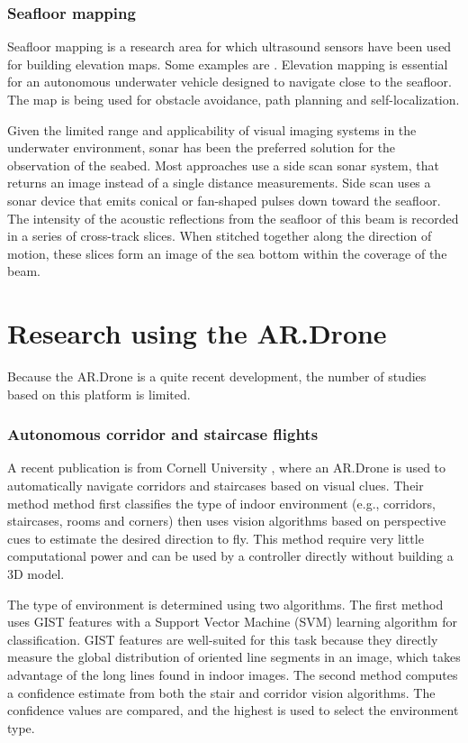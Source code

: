 \subsubsection{Seafloor mapping}
Seafloor mapping is a research area for which ultrasound sensors have been used for building elevation maps. Some examples are \cite{johnson1996seafloor,strauss1999multibeam,zerr1996three,evans2002three}.
Elevation mapping is essential for an autonomous underwater vehicle designed to navigate close to the seafloor.
The map is being used for obstacle avoidance, path planning and self-localization.

Given the limited range and applicability of visual imaging systems in the underwater environment,
sonar has been the preferred solution \cite{blondel1997handbook} for the observation of the seabed.
Most approaches use a side scan sonar system, that returns an image instead of a single distance measurements.
Side scan uses a sonar device that emits conical or fan-shaped pulses down toward the seafloor.
The intensity of the acoustic reflections from the seafloor of this beam is recorded in a series of cross-track slices.
When stitched together along the direction of motion, these slices form an image of the sea bottom within the coverage of the beam.


\section{Research using the AR.Drone}
Because the AR.Drone is a quite recent development, the number of studies based on this platform is limited.

\subsubsection{Autonomous corridor and staircase flights}

A recent publication is from Cornell University \cite{Bills2011icra}, where an AR.Drone is used to automatically navigate corridors and staircases based on visual clues.
Their method method first classifies the type of indoor environment (e.g., corridors, staircases, rooms and corners) then uses vision algorithms based on perspective cues to estimate the desired direction to fly.
This method require very little computational power and can be used by a controller directly without building a 3D model.

The type of environment is determined using two algorithms.
The first method uses GIST features \cite{oliva2001modeling} with a Support Vector Machine (SVM) learning algorithm for classification.
GIST features are well-suited for this task because they directly measure the global distribution of oriented line segments in an image, which takes advantage of the long lines found in indoor images.
The second method computes a confidence estimate from both the stair and corridor vision algorithms.
The confidence values are compared, and the highest is used to select the environment type.

